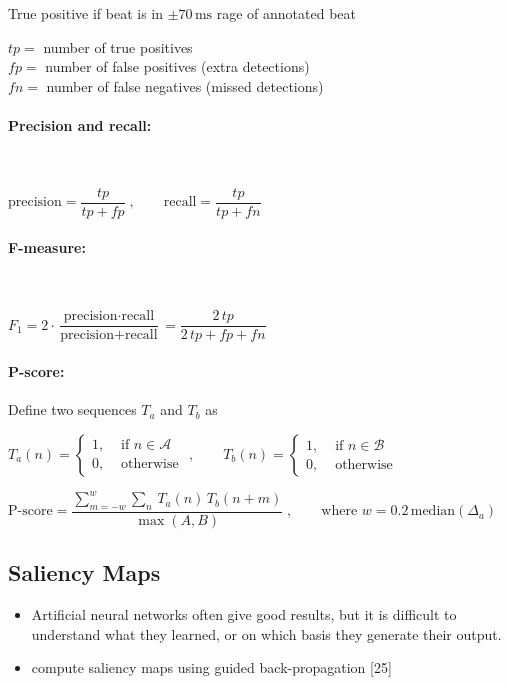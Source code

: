 \documentclass{scrartcl}
\begin{document}
True positive if beat is in $\pm 70\,\text{ms}$ rage of annotated beat

$tp =$ number of true positives \\
$fp =$ number of false positives (extra detections) \\
$fn =$ number of false negatives (missed detections) 

\paragraph{Precision and recall:} $ $

$\text{precision} = \dfrac{tp}{tp + fp}\;, \qquad \text{recall} = \dfrac{tp}{tp + fn}$


\paragraph{F-measure:} $ $

$F_1 = 2 \cdot \dfrac{\text{precision} \cdot \text{recall}}{\text{precision} + \text{recall}} = \dfrac{2\, tp}{2\, tp + fp + fn}$

\paragraph{P-score:} Define two sequences $T_a$ and $T_b$ as 

$T_a(n) = \begin{cases}
	1, &\text{ if } n \in \mathcal A \\
	0 , & \text{ otherwise }
\end{cases}, \qquad T_b(n) = \begin{cases}
	1, &\text{ if } n \in \mathcal B \\
	0 , & \text{ otherwise }
\end{cases}$

$\text{P-score} = \dfrac{\displaystyle \sum_{m=-w}^w  \sum_{n}\,  T_a(n)\,  T_b(n+m)}{\max(A,B)} \;, \qquad \text{where } w = 0.2 \, \text{median}(\Delta_a)$ 



\subsection{Saliency Maps}

\begin{itemize}
\item Artificial neural networks often give good results, but it is difficult to understand what they learned, or on which basis they generate their output.
\item compute saliency maps using guided back-propagation [25]
\end{itemize}
\end{document}
